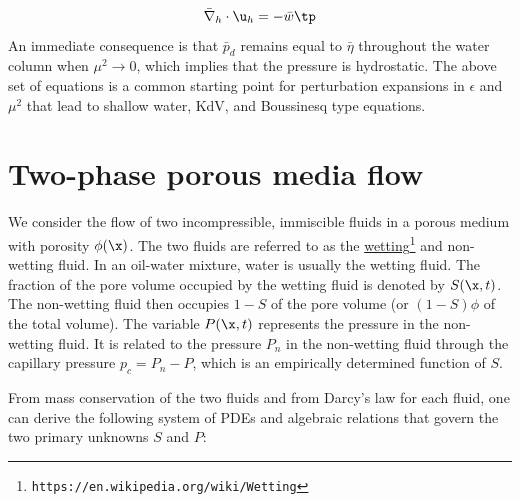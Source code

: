 \documentclass[graybox,envcountchap,sectrefs,final]{svmonodo}
\begin{document}
\begin{equation}
\label{scale:surfacewave:kinbott3}
\bar\nabla_h\cdot\u_h =-\bar w\tp
\end{equation}
An immediate consequence is that $\bar p_d$ remains equal to $\bar \eta$ throughout the water column when $\mu^2\rightarrow 0$, which implies that the pressure
is hydrostatic. The above set of equations is a common  starting point for
perturbation expansions in $\epsilon$ and $\mu^2$ that lead to shallow water,
KdV, and Boussinesq type equations.


\section{Two-phase porous media flow}

We consider the flow of two incompressible, immiscible fluids in
a porous medium with porosity $\phi (\x)$. The two fluids are referred to
as the \href{{https://en.wikipedia.org/wiki/Wetting}}{wetting}\footnote{\texttt{https://en.wikipedia.org/wiki/Wetting}} and
non-wetting fluid. In an oil-water mixture, water is usually the
wetting fluid. The fraction of the pore volume occupied by the
wetting fluid is denoted by $S(\x,t)$. The non-wetting fluid then occupies
$1-S$ of the pore volume (or $(1-S)\phi$ of the total volume).
The variable $P(\x,t)$ represents the pressure in the non-wetting fluid.
It is related to the pressure $P_n$ in the non-wetting fluid through
the capillary pressure $p_c=P_n-P$, which is an empirically determined
function of $S$.

From mass conservation of the two fluids and from Darcy's law for
each fluid, one can derive the following system of PDEs and
algebraic relations that govern the two primary unknowns $S$ and $P$:
\end{document}
